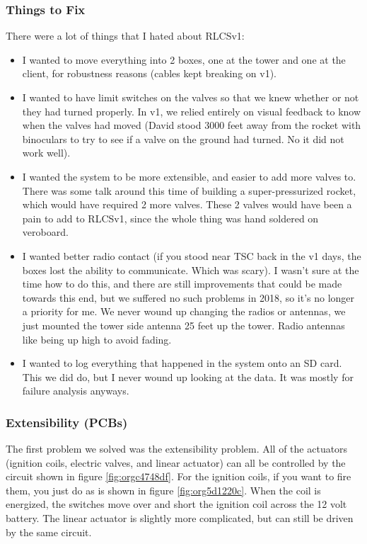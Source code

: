 \documentclass[11pt]{article}
\begin{document}
\subsubsection{Things to Fix}
\label{sec:org0dd499f}

There were a lot of things that I hated about RLCSv1:
\begin{itemize}
\item I wanted to move everything into 2 boxes, one at the tower and one at the
client, for robustness reasons (cables kept breaking on v1).
\item I wanted to have limit switches on the valves so that we knew whether or not
they had turned properly. In v1, we relied entirely on visual feedback to know
when the valves had moved (David stood 3000 feet away from the rocket with
binoculars to try to see if a valve on the ground had turned. No it did not
work well).
\item I wanted the system to be more extensible, and easier to add more valves
to. There was some talk around this time of building a super-pressurized
rocket, which would have required 2 more valves. These 2 valves would have
been a pain to add to RLCSv1, since the whole thing was hand soldered on
veroboard.
\item I wanted better radio contact (if you stood near TSC back in the v1 days, the
boxes lost the ability to communicate. Which was scary). I wasn't sure at the
time how to do this, and there are still improvements that could be made
towards this end, but we suffered no such problems in 2018, so it's no longer
a priority for me. We never wound up changing the radios or antennas, we just
mounted the tower side antenna 25 feet up the tower. Radio antennas like being
up high to avoid fading.
\item I wanted to log everything that happened in the system onto an SD card. This
we did do, but I never wound up looking at the data. It was mostly for failure
analysis anyways.
\end{itemize}

\subsubsection{Extensibility (PCBs)}
\label{sec:org34b0ba2}

The first problem we solved was the extensibility problem. All of the actuators
(ignition coils, electric valves, and linear actuator) can all be controlled by
the circuit shown in figure \ref{fig:orgc4748df}. For the ignition coils, if you want
to fire them, you just do as is shown in figure \ref{fig:org5d1220c}. When the coil
is energized, the switches move over and short the ignition coil across the 12
volt battery. The linear actuator is slightly more complicated, but can still be
driven by the same circuit.
\end{document}
